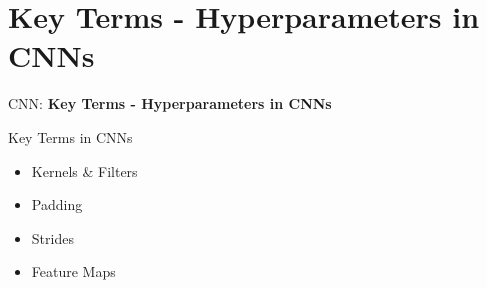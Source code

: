 \section{Key Terms - Hyperparameters in CNNs}
\begin{frame}{}
    \LARGE CNN: \textbf{Key Terms - Hyperparameters in CNNs}
\end{frame}

\begin{frame}{Key Terms in CNNs}
    \begin{itemize}
        \item Kernels & Filters
        \item Padding
        \item Strides
        \item Feature Maps
    \end{itemize}
\end{frame}





